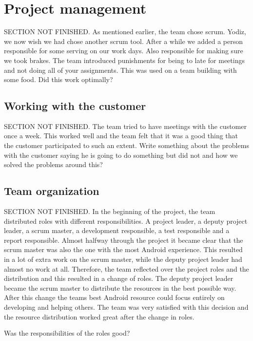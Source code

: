 \section{Project management}
SECTION NOT FINISHED. As mentioned earlier, the team chose scrum. Yodiz, we now wish we had chose another scrum tool. After a while we added a person responsible for some serving on our work days. Also responsible for making sure we took brakes. 
The team introduced punishments for being to late for meetings and not doing all of your assignments. This was used on a team building with some food. Did this work optimally?
\subsection{Working with the customer}
SECTION NOT FINISHED. The team tried to have meetings with the customer once a week. This worked well and the team felt that it was a good thing that the customer participated to such an extent. Write something about the problems with the customer saying he is going to do something but did not and how we solved the problems around this?

\subsection{Team organization}
SECTION NOT FINISHED.
In the beginning of the project, the team distributed roles with different responsibilities. A project leader, a deputy project leader, a scrum master, a development responsible, a test responsible and a report responsible. Almost halfway through the project it became clear that the scrum master was also the one with the most Android experience. This resulted in a lot of extra work on the scrum master, while the deputy project leader had almost no work at all. Therefore, the team reflected over the project roles and the distribution and this resulted in a change of roles. The deputy project leader became the scrum master to distribute the resources in the best possible way. After this change the teams best Android resource could focus entirely on developing and helping others. The team was very satisfied with this decision and the resource distribution worked great after the change in roles. 

Was the responsibilities of the roles good?

